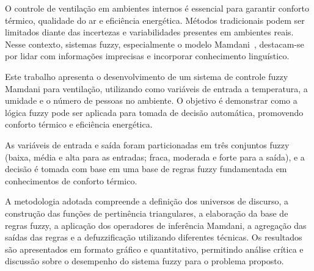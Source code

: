 O controle de ventilação em ambientes internos é essencial para garantir conforto térmico, qualidade do ar e eficiência energética. Métodos tradicionais podem ser limitados diante das incertezas e variabilidades presentes em ambientes reais. Nesse contexto, sistemas fuzzy, especialmente o modelo Mamdani~\cite{mamdani1975experiment}, destacam-se por lidar com informações imprecisas e incorporar conhecimento linguístico.

Este trabalho apresenta o desenvolvimento de um sistema de controle fuzzy Mamdani para ventilação, utilizando como variáveis de entrada a temperatura, a umidade e o número de pessoas no ambiente. O objetivo é demonstrar como a lógica fuzzy pode ser aplicada para tomada de decisão automática, promovendo conforto térmico e eficiência energética.

As variáveis de entrada e saída foram particionadas em três conjuntos fuzzy (baixa, média e alta para as entradas; fraca, moderada e forte para a saída), e a decisão é tomada com base em uma base de regras fuzzy fundamentada em conhecimentos de conforto térmico.

A metodologia adotada compreende a definição dos universos de discurso, a construção das funções de pertinência triangulares, a elaboração da base de regras fuzzy, a aplicação dos operadores de inferência Mamdani, a agregação das saídas das regras e a defuzzificação utilizando diferentes técnicas. Os resultados são apresentados em formato gráfico e quantitativo, permitindo análise crítica e discussão sobre o desempenho do sistema fuzzy para o problema proposto.